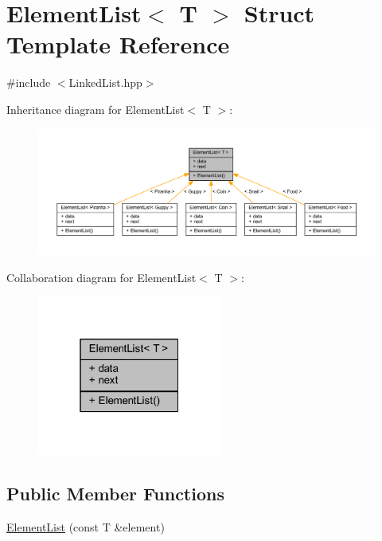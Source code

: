 \hypertarget{struct_element_list}{}\section{Element\+List$<$ T $>$ Struct Template Reference}
\label{struct_element_list}


{\ttfamily \#include $<$Linked\+List.\+hpp$>$}



Inheritance diagram for Element\+List$<$ T $>$\+:
\nopagebreak
\begin{figure}[H]
\begin{center}
\leavevmode
\includegraphics[width=350pt]{struct_element_list__inherit__graph}
\end{center}
\end{figure}


Collaboration diagram for Element\+List$<$ T $>$\+:
\nopagebreak
\begin{figure}[H]
\begin{center}
\leavevmode
\includegraphics[width=172pt]{struct_element_list__coll__graph}
\end{center}
\end{figure}
\subsection*{Public Member Functions}
\begin{DoxyCompactItemize}
\item 
\mbox{\hyperlink{struct_element_list_a2f2c3bfdd0cda10f2e50f8f04758b52a}{Element\+List}} (const T \&element)
\end{DoxyCompactItemize}
